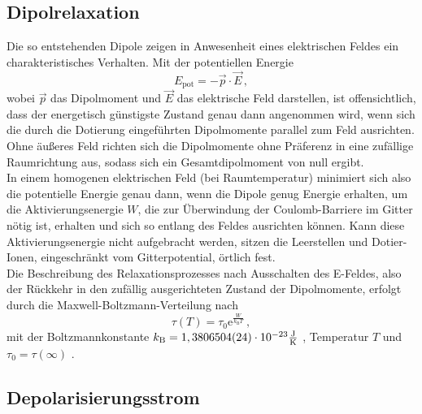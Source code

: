 \subsection{Dipolrelaxation}

Die so entstehenden Dipole zeigen in Anwesenheit eines elektrischen Feldes ein charakteristisches Verhalten.
Mit der potentiellen Energie
\begin{equation}
    E_\text{pot} = - \vec{p} \cdot \vec{E} \,,
    \label{eq:potE}
\end{equation}
wobei $\vec{p}$ das Dipolmoment und $\vec{E}$ das elektrische Feld darstellen, ist offensichtlich, dass der energetisch günstigste Zustand genau dann angenommen wird, 
wenn sich die durch die Dotierung eingeführten Dipolmomente parallel zum Feld ausrichten. \\

Ohne äußeres Feld richten sich die Dipolmomente ohne Präferenz in eine zufällige Raumrichtung aus, sodass sich ein Gesamtdipolmoment von null ergibt. \\
In einem homogenen elektrischen Feld (bei Raumtemperatur) minimiert sich also die potentielle Energie genau dann, wenn die Dipole genug Energie erhalten, um die Aktivierungsenergie $W$, 
die zur Überwindung der Coulomb-Barriere im Gitter nötig ist, erhalten und sich so entlang des Feldes ausrichten können.
Kann diese Aktivierungsenergie nicht aufgebracht werden, sitzen die Leerstellen und Dotier-Ionen, eingeschränkt vom Gitterpotential, örtlich fest. \\
Die Beschreibung des Relaxationsprozesses nach Ausschalten des E-Feldes, also der Rückkehr in den zufällig ausgerichteten Zustand der Dipolmomente, erfolgt durch die Maxwell-Boltzmann-Verteilung nach
\begin{equation}
    \tau(T) = \tau_0 \text{e}^{\frac{W}{k_\text{B} T}}  \,,
    \label{eq:relaxationszeit}
\end{equation}
mit der Boltzmannkonstante $k_\text{B} = 1,380 6504(24) \cdot 10^{-23} \si{\frac{\joule}{\kelvin}} $ \cite{pdg}, Temperatur $T$ und $\tau_0 = \tau(\infty)$ \cite{v48}.

\subsection{Depolarisierungsstrom}

